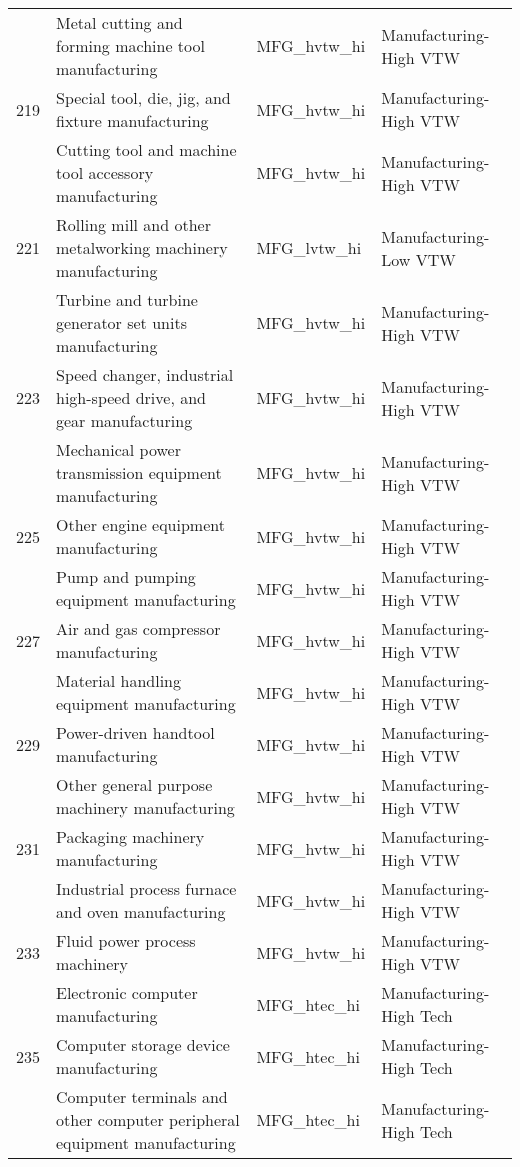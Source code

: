 \begin{landscape}
\begin{small}
\begin{longtable}{clll}
\gray 218 & Metal cutting and forming machine tool manufacturing & MFG\_hvtw\_hi & Manufacturing-High VTW \\
219 & Special tool, die, jig, and fixture manufacturing & MFG\_hvtw\_hi & Manufacturing-High VTW \\
\gray 220 & Cutting tool and machine tool accessory manufacturing & MFG\_hvtw\_hi & Manufacturing-High VTW \\
221 & Rolling mill and other metalworking machinery manufacturing & MFG\_lvtw\_hi & Manufacturing-Low VTW \\
\gray 222 & Turbine and turbine generator set units manufacturing & MFG\_hvtw\_hi & Manufacturing-High VTW \\
223 & Speed changer, industrial high-speed drive, and gear manufacturing & MFG\_hvtw\_hi & Manufacturing-High VTW \\
\gray 224 & Mechanical power transmission equipment manufacturing & MFG\_hvtw\_hi & Manufacturing-High VTW \\
225 & Other engine equipment manufacturing & MFG\_hvtw\_hi & Manufacturing-High VTW \\
\gray 226 & Pump and pumping equipment manufacturing & MFG\_hvtw\_hi & Manufacturing-High VTW \\
227 & Air and gas compressor manufacturing & MFG\_hvtw\_hi & Manufacturing-High VTW \\
\gray 228 & Material handling equipment manufacturing & MFG\_hvtw\_hi & Manufacturing-High VTW \\
229 & Power-driven handtool manufacturing & MFG\_hvtw\_hi & Manufacturing-High VTW \\
\gray 230 & Other general purpose machinery manufacturing & MFG\_hvtw\_hi & Manufacturing-High VTW \\
231 & Packaging machinery manufacturing & MFG\_hvtw\_hi & Manufacturing-High VTW \\
\gray 232 & Industrial process furnace and oven manufacturing & MFG\_hvtw\_hi & Manufacturing-High VTW \\
233 & Fluid power process machinery & MFG\_hvtw\_hi & Manufacturing-High VTW \\
\gray 234 & Electronic computer manufacturing & MFG\_htec\_hi & Manufacturing-High Tech \\
235 & Computer storage device manufacturing & MFG\_htec\_hi & Manufacturing-High Tech \\
\gray 236 & Computer terminals and other computer peripheral equipment manufacturing & MFG\_htec\_hi & Manufacturing-High Tech \\

\end{longtable}
\end{small}
\end{landscape}
